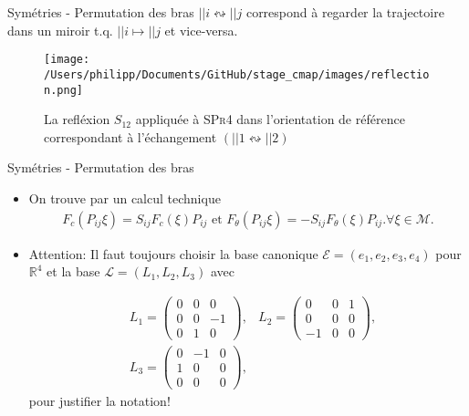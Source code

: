 \documentclass[10pt, envcountsect]{beamer}
\theoremstyle{plain}
\newcommand{\M}{\mathcal{M}}
\newcommand{\R}{\mathbb{R}}
\begin{document}
\begin{frame}{Symétries - Permutation des bras}
 $||i \leftrightsquigarrow ||j$ correspond à regarder la trajectoire dans un miroir t.q. $||i \mapsto ||j$ et vice-versa.
\begin{figure}[h]
\centering
\texttt{[image: /Users/philipp/Documents/GitHub/stage\_cmap/images/reflection.png]}
\caption{La refléxion $S_{12}$ appliquée à \textsc{SPr4} dans l'orientation de référence correspondant à l'échangement $(||1 \leftrightsquigarrow ||2)$ }
\label{fig:reflection of swimmer}
\end{figure}
\end{frame}

\begin{frame}{Symétries - Permutation des bras}
\begin{itemize}
\item On trouve par un calcul technique
\begin{align}
	 F_c(P_{ij} \xi) = S_{ij} F_c(\xi) P_{ij} \text{ et } F_{\theta}(P_{ij} \xi) = - S_{ij} F_{\theta}(\xi) P_{ij}. \forall \xi \in \M.
\end{align}

\item Attention: Il faut toujours choisir la base canonique $\mathcal{E} = (e_1, e_2,e_3, e_4)$ pour $\R^4$ et la base $\mathcal{L} = (L_1, L_2, L_3)$ avec

\renewcommand{\arraystretch}{0.7}
\begin{align}
	&L_1 =  \left(\begin{array}{ccc}
	0 & 0 & 0 \\ 
	0 & 0 & -1 \\ 
	0 & 1 & 0
	\end{array}  \right ),
	&L_2 =  \left (\begin{array}{ccc}
	0 & 0 & 1 \\ 
	0 & 0 & 0 \\ 
	-1 & 0 & 0
	\end{array}  \right ),\\
	&L_3 = \left (\begin{array}{ccc}
	0 & -1 & 0 \\ 
	1 & 0 & 0 \\ 
	0 & 0 & 0
	\end{array}  \right ),
\end{align}
\renewcommand{\arraystretch}{1}
pour justifier la notation!
\end{itemize}
\end{frame}
\end{document}
